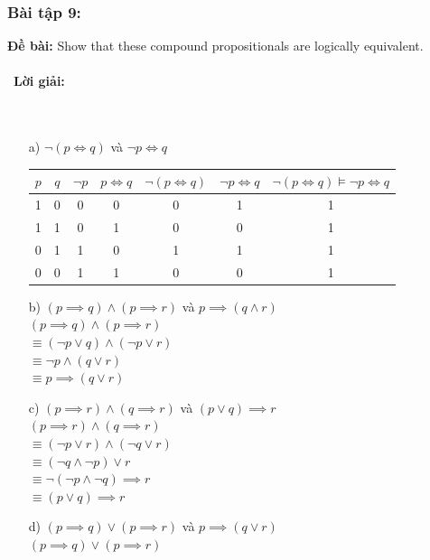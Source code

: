 \documentclass[a4paper]{article}
\begin{document}
\subsubsection{Bài tập 9:}
\textbf{Đề bài:} Show that these compound propositionals are logically equivalent. \\\ \\\
\textbf{Lời giải:} \\\ \\\
\begin{enumerate}
		\item[a)] $\lnot (p \iff q)$ và $\lnot p \iff q$
			\begin{table} [h]
			\centering
			\begin{tabular} {|c|c|c|c|c|c|c|}
				\hline
				$p$&$q$&$\lnot p$&$  p \iff q$&$\lnot (p \iff q)$&$ \lnot p \iff q$& $\lnot (p \iff q) \vDash \lnot p \iff q$\\
				\hline
				1&0&0&0&0&1&1\\
				1&1&0&1&0&0&1\\
				0&1&1&0&1&1&1\\
				0&0&1&1&0&0&1\\
				\hline
			\end{tabular}
		\end{table}
		\item[b)]	$(p \implies q) \land (p \implies r) $ và $ p \implies (q \land r)$\\
					$(p \implies q) \land (p \implies r)$\\
					$\equiv (\lnot p \lor q) \land (\lnot p \lor r)$\\
					$\equiv  \lnot p \land (q \lor r)$\\
					$\equiv  p \implies (q \lor r)$\\
		 \item[c)]  $(p\implies r) \land (q \implies r) $ và $ (p \lor q) \implies r$\\ 
		 			$(p\implies r) \land (q \implies r)$\\
		 			$\equiv (\lnot p \lor r) \land (\lnot q \lor r)$\\
		 			$\equiv (\lnot q \land \lnot p) \lor r$\\
		 			$\equiv  \lnot(\lnot p \land \lnot q) \implies r$\\
		 			$\equiv (p \lor q) \implies r$\\
		 \item[d)]	$(p \implies q) \lor (p \implies r) $ và $ p \implies (q \lor r)$\\
		 			$(p \implies q) \lor (p \implies r)$\\

\end{enumerate}
\end{document}
